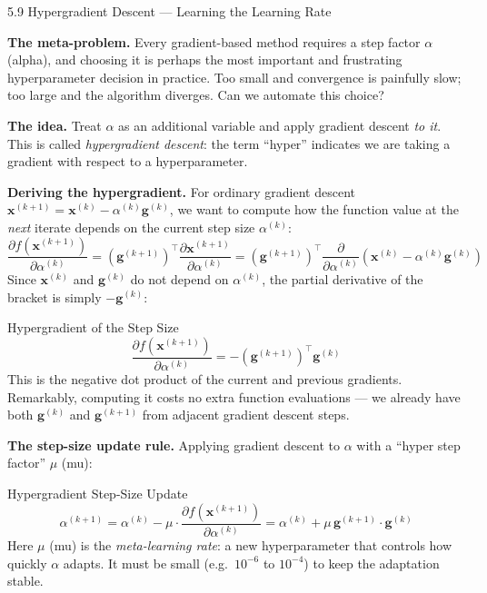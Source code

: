 \documentclass[aspectratio=169,10pt]{beamer}
\newcommand{\vx}{\mathbf{x}}
\newcommand{\vg}{\mathbf{g}}
\begin{document}
\begin{frame}[allowframebreaks]{5.9 Hypergradient Descent --- Learning the Learning Rate}

  \textbf{The meta-problem.}  Every gradient-based method
  requires a step factor $\alpha$ (alpha), and choosing it is
  perhaps the most important and frustrating hyperparameter
  decision in practice.  Too small and convergence is
  painfully slow; too large and the algorithm diverges.
  Can we automate this choice?

  \vspace{0.5em}
  \textbf{The idea.}  Treat $\alpha$ as an additional variable
  and apply gradient descent \emph{to it}.  This is called
  \emph{hypergradient descent}: the term ``hyper'' indicates
  we are taking a gradient with respect to a hyperparameter.

  \vspace{0.5em}
  \textbf{Deriving the hypergradient.}  For ordinary gradient
  descent $\vx^{(k+1)} = \vx^{(k)} - \alpha^{(k)}\vg^{(k)}$,
  we want to compute how the function value at the \emph{next}
  iterate depends on the current step size $\alpha^{(k)}$:
  \[
    \frac{\partial f(\vx^{(k+1)})}{\partial \alpha^{(k)}}
    = \left(\vg^{(k+1)}\right)^\top
      \frac{\partial \vx^{(k+1)}}{\partial \alpha^{(k)}}
    = \left(\vg^{(k+1)}\right)^\top
      \frac{\partial}{\partial\alpha^{(k)}}
      \left(\vx^{(k)} - \alpha^{(k)}\vg^{(k)}\right)
  \]
  Since $\vx^{(k)}$ and $\vg^{(k)}$ do not depend on
  $\alpha^{(k)}$, the partial derivative of the bracket is
  simply $-\vg^{(k)}$:
  \begin{block}{Hypergradient of the Step Size}
    \[
      \frac{\partial f(\vx^{(k+1)})}{\partial \alpha^{(k)}}
      = -\left(\vg^{(k+1)}\right)^\top \vg^{(k)}
    \]
    This is the negative dot product of the current and
    previous gradients.  Remarkably, computing it costs
    no extra function evaluations --- we already have both
    $\vg^{(k)}$ and $\vg^{(k+1)}$ from adjacent gradient
    descent steps.
  \end{block}

  \framebreak

  \textbf{The step-size update rule.}  Applying gradient descent
  to $\alpha$ with a ``hyper step factor'' $\mu$ (mu):

  \begin{block}{Hypergradient Step-Size Update}
    \[
      \alpha^{(k+1)}
      = \alpha^{(k)} - \mu \cdot
        \frac{\partial f(\vx^{(k+1)})}{\partial \alpha^{(k)}}
      = \alpha^{(k)} + \mu\,\vg^{(k+1)}\cdot\vg^{(k)}
    \]
    Here $\mu$ (mu) is the \emph{meta-learning rate}: a new
    hyperparameter that controls how quickly $\alpha$ adapts.
    It must be small (e.g.\ $10^{-6}$ to $10^{-4}$) to keep
    the adaptation stable.
  \end{block}


\end{frame}
\end{document}
